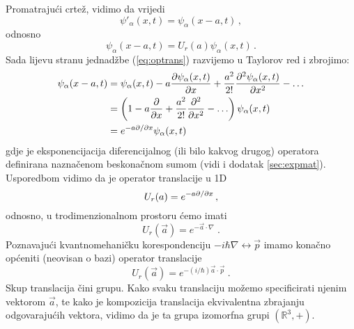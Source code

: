 \centerline{}
Promatrajući crtež, vidimo da vrijedi
\begin{equation}
 \psi'_{\alpha}(x,t)=\psi_{\alpha}(x-a,t) \,,
\end{equation}
odnosno
\begin{equation}
 \psi_{\alpha}(x-a,t)=U_{r}(a)\psi_{\alpha}(x,t)   \,.
 \label{eq:optrans}
\end{equation}
Sada lijevu stranu jednadžbe (\ref{eq:optrans}) razvijemo u Taylorov red
i zbrojimo:
\begin{equation*}
\begin{split}
 \psi_{\alpha}(x-a,t)&=\psi_{\alpha}(x,t)-a\frac{\partial\psi_{\alpha}(x,t)}
{\partial x}+\frac{a^2}{2!}\frac{\partial^2 \psi_{\alpha}(x,t)}{\partial x^2}-\ldots \\
&=\left(1-a\frac{\partial}{\partial x}+\frac{a^2}{2!}\frac{\partial^2}{\partial x^2} - \ldots\right)
\psi_{\alpha}(x,t) \\
&=e^{-a \partial / \partial  x} \psi_{\alpha}(x,t)
\end{split}
\end{equation*}
gdje je eksponencijacija diferencijalnog (ili bilo kakvog drugog) operatora
definirana naznačenom beskonačnom sumom (vidi i dodatak \ref{sec:expmat}).
Usporedbom vidimo da je operator translacije u 1D
\begin{equation}
U_r(a)= e^{-a \partial / \partial  x} \,,
\end{equation}
odnosno, u trodimenzionalnom prostoru ćemo imati
\begin{equation}
U_r(\vec{a})= e^{-\vec{a}\cdot\nabla} \;.
\end{equation}
Poznavajući kvantnomehaničku korespondenciju $-i\hbar\nabla \leftrightarrow
\vec{p}$ imamo konačno općeniti (neovisan o bazi) operator translacije
\begin{equation}
U_r(\vec{a})= e^{-(i/\hbar)\vec{a}\cdot\vec{p}} \;.
\label{eq:Ur}
\end{equation}
Skup translacija čini grupu. Kako svaku translaciju možemo specificirati njenim 
vektorom $\vec{a}$, te kako je kompozicija translacija ekvivalentna zbrajanju
odgovarajućih vektora, vidimo da je ta grupa izomorfna grupi $(\mathbb{R}^3, +)$.

